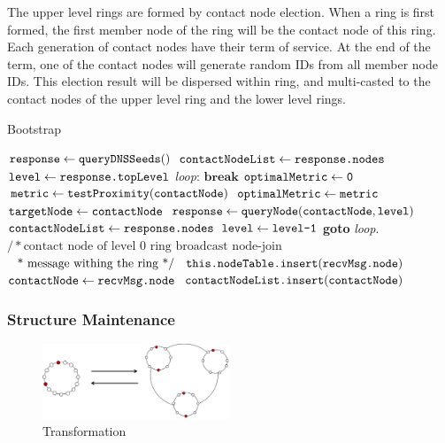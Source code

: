 The upper level rings are formed by contact node election. When a ring is first formed, the first member node of the ring will be the contact node of this ring. Each generation of contact nodes have their term of service. At the end of the term, one of the contact nodes will generate random IDs from all member node IDs. This election result will be dispersed within ring, and multi-casted to the contact nodes of the upper level ring and the lower level rings.

\begin{algorithm}
	\caption{Bootstrap}\label{euclid}
	\begin{algorithmic}[1]
		\State $\texttt{response} \gets \texttt{queryDNSSeeds}()$
		\State $\texttt{contactNodeList} \gets \texttt{response.nodes}$
		\State $\texttt{level} \gets \texttt{response.topLevel}$
		\BState \emph{loop}:
		\State $\textbf{break}$
		\Else
		\State $\texttt{optimalMetric} \gets \texttt{0}$
		\State $\texttt{metric} \gets \texttt{testProximity}(\texttt{contactNode})$
		\State $\texttt{optimalMetric} \gets \texttt{metric}$
		\State $\texttt{targetNode} \gets \texttt{contactNode}$
		\EndIf
		\EndFor
		\State $\texttt{response} \gets \texttt{queryNode}(\texttt{contactNode}, \texttt{level})$
		\State $\texttt{contactNodeList} \gets \texttt{response.nodes}$
		\State $\texttt{level} \gets \texttt{level}\texttt{-1}$
		\State \textbf{goto} \emph{loop}.
		\EndIf
		\State $/* \text{contact node of level 0 ring broadcast node-join}$
		\State $\text{\; * message withing the ring */}$
		\State $\texttt{this.}\texttt{nodeTable.insert}(\texttt{recvMsg.node})$
		\State $\texttt{contactNode} \gets \texttt{recvMsg.node}$
		\State $\texttt{contactNodeList.insert}(\texttt{contactNode})$
		\EndIf
		\EndProcedure
	\end{algorithmic}
\end{algorithm}

\subsubsection{Structure Maintenance} \label{maintain}

\begin{figure}[t]
	\includegraphics[width=0.5\textwidth]{figures/transformation.jpg}
	\caption{Transformation}
	\label{fig:topo}
\end{figure}

